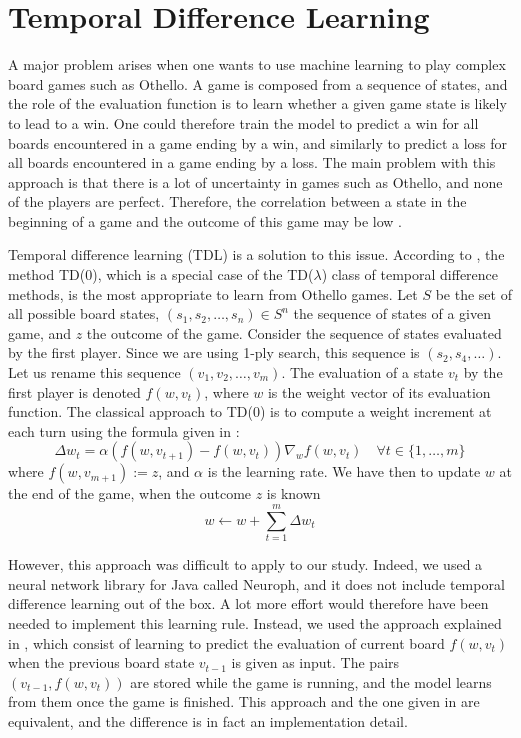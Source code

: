 \documentclass[a4paper, 9pt, twoside, twocolumn]{article}
\begin{document}
\section{Temporal Difference Learning}
\label{sec:tdl}
A major problem arises when one wants to use machine learning to play complex
board games such as Othello. A game is composed from a sequence of states, and
the role of the evaluation function is to learn whether a given game state is
likely to lead to a win. One could therefore train the model to predict a win
for all boards encountered in a game ending by a win, and similarly to predict a
loss for all boards encountered in a game ending by a loss. The main problem
with this approach is that there is a lot of uncertainty in games such as
Othello, and none of the players are perfect. Therefore, the correlation between a state in
the beginning of a game and the outcome of this game may be low \cite{Binkly2007}.

Temporal difference learning (TDL) \cite{Sutton1988} is a solution to this
issue. According to \cite{Binkly2007, Leouski1996}, the method TD($0$), which is a special
case of the TD($\lambda$) class of temporal difference methods, is the most
appropriate to learn from Othello games. Let $S$ be the set of all possible
board states,  $(s_1,s_2,\dots,s_n)\in S^n$ the sequence of states of a given
game, and $z$ the outcome of the game. Consider the sequence of states evaluated
by the first player. Since we are using 1-ply search, this sequence is $(s_2,
s_4, \dots)$. Let us rename this sequence $(v_1, v_2, \dots, v_m)$. The
evaluation of a state $v_t$ by the first player is denoted $f(w, v_t)$, where
$w$ is the weight vector of its evaluation function. The classical approach to
TD($0$) is to compute a weight increment at each turn using the formula given in
\cite{Sutton1988}:
\begin{equation}
    \Delta w_t=\alpha(f(w, v_{t+1}) - f(w, v_t))\nabla_w f(w, v_t)\quad\forall t\in\{1,\dots,m\}
\end{equation}
where $f(w, v_{m+1}) := z$, and $\alpha$ is the learning rate. We have then to
update $w$ at the end of the game, when the outcome $z$ is known
\begin{equation}
    w\leftarrow w+\sum_{t=1}^m \Delta w_t
\end{equation}

However, this approach was difficult to apply to our study. Indeed, we used a
neural network library for Java called Neuroph, and it does not include temporal
difference learning out of the box. A lot more effort would therefore have been
needed to implement this learning rule. Instead, we used the approach explained
in \cite{Steeg2015}, which consist of learning to predict the evaluation of
current board $f(w, v_t)$ when the previous board state $v_{t-1}$ is given as
input. The pairs $(v_{t-1}, f(w, v_t))$ are stored while the game is running,
and the model learns from them once the game is finished. This approach and the
one given in \cite{Sutton1988} are equivalent, and the difference is in fact
an implementation detail.
\end{document}
